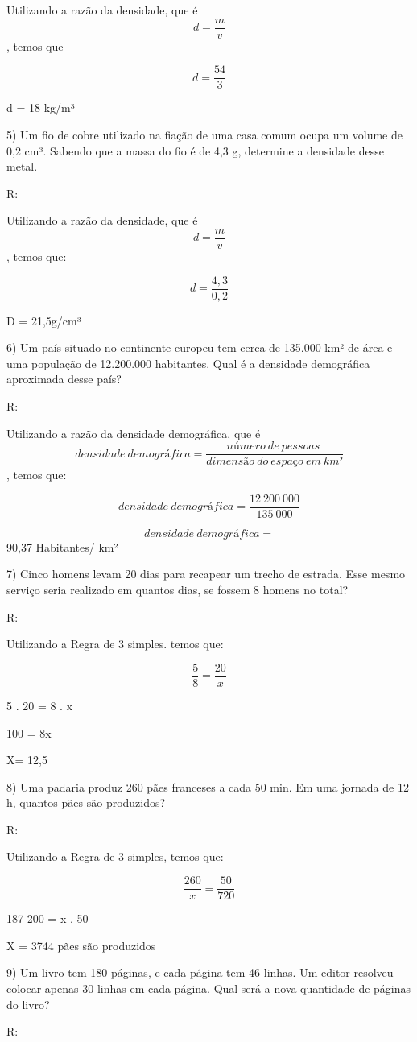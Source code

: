 Utilizando a razão da densidade, que é \[d = \frac{m}{v}\], temos que

\[d = \frac{54}{3}\]

d = 18 kg/m³

5) Um fio de cobre utilizado na fiação de uma casa comum ocupa um volume
de 0,2 cm³. Sabendo que a massa do fio é de 4,3 g, determine a densidade
desse metal.

R:

Utilizando a razão da densidade, que é \[d = \frac{m}{v}\], temos que:

\[d = \frac{4,3}{0,2}\]

D = 21,5g/cm³

6) Um país situado no continente europeu tem cerca de 135.000 km² de
área e uma população de 12.200.000 habitantes. Qual é a densidade
demográfica aproximada desse país?

R:

Utilizando a razão da densidade demográfica, que é
\[densidade\ demográfica = \frac{número\ de\ pessoas\ }{dimensão\ do\ espaço\ em\ km²}\],
temos que:

\[densidade\ demográfica = \frac{12\ 200\ 000}{135\ 000}\]

\[densidade\ demográfica =\] 90,37 Habitantes/ km²

7) Cinco homens levam 20 dias para recapear um trecho de estrada. Esse
mesmo serviço seria realizado em quantos dias, se fossem 8 homens no
total?

R:

Utilizando a Regra de 3 simples. temos que:

\[\frac {5}{8} = \frac{20}{x}\]

5 . 20 = 8 . x

100 = 8x

X= 12,5

8) Uma padaria produz 260 pães franceses a cada 50 min. Em uma jornada
de 12 h, quantos pães são produzidos?

R:

Utilizando a Regra de 3 simples, temos que:

\[\frac {260}{x} = \frac{50}{720}\]

187 200 = x . 50

X = 3744 pães são produzidos

9) Um livro tem 180 páginas, e cada página tem 46 linhas. Um editor
resolveu colocar apenas 30 linhas em cada página. Qual será a nova
quantidade de páginas do livro?

R:


